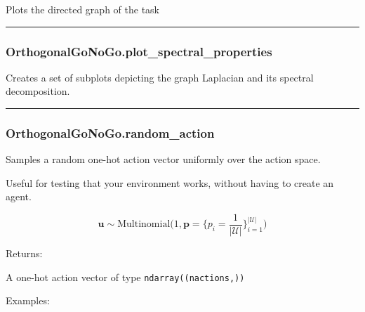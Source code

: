 Plots the directed graph of the task

\begin{center}\rule{0.5\linewidth}{\linethickness}\end{center}

\subsubsection{OrthogonalGoNoGo.plot\_spectral\_properties}\label{orthogonalgonogo.plot_spectral_properties}

\begin{Shaded}
\begin{Highlighting}[]
\OperatorTok{=}\OperatorTok{=}\OperatorTok{=}\NormalTok{)}
\end{Highlighting}
\end{Shaded}

Creates a set of subplots depicting the graph Laplacian and its spectral
decomposition.

\begin{center}\rule{0.5\linewidth}{\linethickness}\end{center}

\subsubsection{OrthogonalGoNoGo.random\_action}\label{orthogonalgonogo.random_action}

\begin{Shaded}
\begin{Highlighting}[]
\NormalTok{)}
\end{Highlighting}
\end{Shaded}

Samples a random one-hot action vector uniformly over the action space.

Useful for testing that your environment works, without having to create
an agent.

\[
\mathbf u \sim \mathrm{Multinomial}\Big(1, \mathbf p=\{p_i = \frac{1}{|\mathcal U|}\}_{i=1}^{|\mathcal U|}\Big)
\]

Returns:

A one-hot action vector of type \texttt{ndarray((nactions,))}

Examples:

